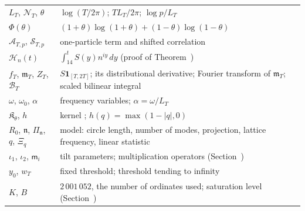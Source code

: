 \documentclass[preprint,12pt]{elsarticle}
\makeatletter
\let\CG@origref\ref
\let\CG@origeqref\eqref
\newcommand{\CG@gettip}[1]{\@ifundefined{CGTip@#1}{Reference: #1}{\csname CGTip@#1\endcsname}}
\DeclareRobustCommand{\CGref}[1]{\pdftooltip{\CG@origref{#1}}{\CG@gettip{#1}}}
\DeclareRobustCommand{\CGeqref}[1]{\pdftooltip{\CG@origeqref{#1}}{\CG@gettip{#1}}}
\numberwithin{equation}{section}
\theoremstyle{plain}
\theoremstyle{definition}
\theoremstyle{remark}
\makeatother
\begin{document}
\begin{center}
\begin{longtable}{p{}p{}}
$L_T$, $\mathcal N_T$, $\theta$ & $\log(T/2\pi)$; $TL_T/2\pi$; $\log p/L_T$\\
$\Phi(\theta)$ & $(1+\theta)\log(1+\theta)+(1-\theta)\log(1-\theta)$\\
$\mathcal A_{T,p}$, $\mathcal S_{T,p}$ & one-particle term and shifted correlation \CGeqref{eq:ATp_STp}\\
$\mathcal H_n(t)$ & $\int_{14}^tS(y)n^{iy}\,dy$ (proof of Theorem~\CGref{thm:projection})\\
$f_T$, $\mathfrak m_T$, $Z_T$, $\mathcal B_T$ & $S\mathbf 1_{[T,2T]}$; its distributional derivative; Fourier transform of $\mathfrak m_T$; scaled bilinear integral \CGeqref{eq:BT_scaled}\\
$\omega$, $\omega_0$, $\alpha$ & frequency variables; $\alpha=\omega/L_T$\\
$\mathfrak K_\theta$, $h$ & kernel \CGeqref{eq:kernel_piecewise}; $h(q)=\max(1-|q|,0)$\\
$R_0$, $\mathfrak n$, $\Pi_{\mathfrak n}$, $q$, $\Xi_q$ & model: circle length, number of modes, projection, lattice frequency, linear statistic\\
$\iota_1$, $\iota_2$, $\mathsf m_i$ & tilt parameters; multiplication operators (Section~\CGref{subsec:det_model})\\
$y_0$, $w_T$ & fixed threshold; threshold tending to infinity\\
$K$, $B$ & $2\,001\,052$, the number of ordinates used; saturation level (Section~\CGref{subsec:one_step_cutoff})\\
\end{longtable}
\end{center}
\end{document}
